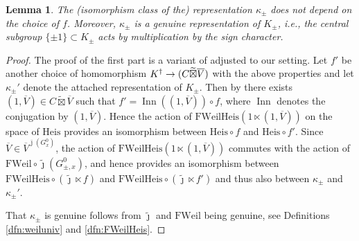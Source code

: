 \documentclass{article}
\def\tx#1{\textrm{#1}}
\def\ol#1{\overline{#1}}
\DeclareMathOperator{\Inn}{Inn}
\newtheorem{lem}[thm]{Lemma}
\theoremstyle{definition}
\numberwithin{equation}{subsection}
\renewcommand{\-}{\hyp{}}
\begin{document}
\begin{lem}
	The (isomorphism class of the) representation $\kappa_{\pm}$ does not depend on the choice of $f$.  Moreover, $\kappa_{\pm}$ is a genuine representation of $K_{\pm}$, i.e.,  the central subgroup $\{ \pm 1\} \subset K_{\pm}$ acts by multiplication by the sign character.
\end{lem}
\begin{proof}
	The proof of the first part is a variant of \cite[3.6.6]{DF} adjusted to our setting. Let $f'$ be another choice of homomorphism $K^\dagger \ra (C \widetilde{\boxtimes}\ol{V})$ with the above properties and let $\kappa_{\pm}'$ denote the attached representation of $K_{\pm}$. Then by \cite[Lemma~3.6.5]{DF} there exists $(1, \ol{V}) \in C \widetilde{\boxtimes}\ol{V}$ such that $f'=\Inn((1,\ol{V})) \circ f$, where $\Inn$ denotes the conjugation by $(1 , \ol{V})$. Hence the action of $\mathrm{FWeilHeis}(1 \ltimes (1,\ol{V} ))$ on the space of $\tx{Heis}$ provides an isomorphism between $\tx{Heis}\circ f$ and $\tx{Heis}\circ f'$. Since $\ol{V} \in \ol{V}^{\bar\jmath(G_x^0)}$, the action of $\mathrm{FWeilHeis}(1 \ltimes (1,\ol{V} ))$ commutes with the action of $\mathrm{FWeil}\circ \tilde \jmath (G^0_{\pm,x})$, and hence provides an isomorphism between $\mathrm{FWeilHeis} \circ (\tilde\jmath \ltimes f)$ and $\mathrm{FWeilHeis} \circ (\tilde\jmath \ltimes f')$ and thus also between $\kappa_{\pm}$ and $\kappa_{\pm}'$.
	
	That $\kappa_{\pm}$ is genuine follows from $\tilde \jmath$ and $\mathrm{FWeil}$ being genuine, see Definitions \ref{dfn:weiluniv} and \ref{dfn:FWeilHeis}.
\end{proof}
\end{document}
